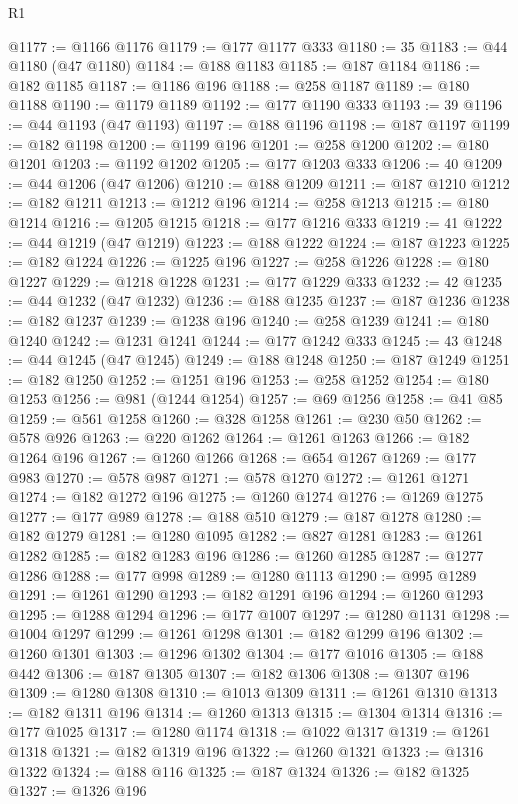 \begin{lexlean}{R1}
\begin{coremodule}
@1177 := @1166 @1176
@1179 := @177 @1177 @333
@1180 := 35
@1183 := @44 @1180 (@47 @1180)
@1184 := @188 @1183
@1185 := @187 @1184
@1186 := @182 @1185
@1187 := @1186 @196
@1188 := @258 @1187
@1189 := @180 @1188
@1190 := @1179 @1189
@1192 := @177 @1190 @333
@1193 := 39
@1196 := @44 @1193 (@47 @1193)
@1197 := @188 @1196
@1198 := @187 @1197
@1199 := @182 @1198
@1200 := @1199 @196
@1201 := @258 @1200
@1202 := @180 @1201
@1203 := @1192 @1202
@1205 := @177 @1203 @333
@1206 := 40
@1209 := @44 @1206 (@47 @1206)
@1210 := @188 @1209
@1211 := @187 @1210
@1212 := @182 @1211
@1213 := @1212 @196
@1214 := @258 @1213
@1215 := @180 @1214
@1216 := @1205 @1215
@1218 := @177 @1216 @333
@1219 := 41
@1222 := @44 @1219 (@47 @1219)
@1223 := @188 @1222
@1224 := @187 @1223
@1225 := @182 @1224
@1226 := @1225 @196
@1227 := @258 @1226
@1228 := @180 @1227
@1229 := @1218 @1228
@1231 := @177 @1229 @333
@1232 := 42
@1235 := @44 @1232 (@47 @1232)
@1236 := @188 @1235
@1237 := @187 @1236
@1238 := @182 @1237
@1239 := @1238 @196
@1240 := @258 @1239
@1241 := @180 @1240
@1242 := @1231 @1241
@1244 := @177 @1242 @333
@1245 := 43
@1248 := @44 @1245 (@47 @1245)
@1249 := @188 @1248
@1250 := @187 @1249
@1251 := @182 @1250
@1252 := @1251 @196
@1253 := @258 @1252
@1254 := @180 @1253
@1256 := @981 (@1244 @1254)
@1257 := @69 @1256
@1258 := @41 @85
@1259 := @561 @1258
@1260 := @328 @1258
@1261 := @230 @50
@1262 := @578 @926
@1263 := @220 @1262
@1264 := @1261 @1263
@1266 := @182 @1264 @196
@1267 := @1260 @1266
@1268 := @654 @1267
@1269 := @177 @983
@1270 := @578 @987
@1271 := @578 @1270
@1272 := @1261 @1271
@1274 := @182 @1272 @196
@1275 := @1260 @1274
@1276 := @1269 @1275
@1277 := @177 @989
@1278 := @188 @510
@1279 := @187 @1278
@1280 := @182 @1279
@1281 := @1280 @1095
@1282 := @827 @1281
@1283 := @1261 @1282
@1285 := @182 @1283 @196
@1286 := @1260 @1285
@1287 := @1277 @1286
@1288 := @177 @998
@1289 := @1280 @1113
@1290 := @995 @1289
@1291 := @1261 @1290
@1293 := @182 @1291 @196
@1294 := @1260 @1293
@1295 := @1288 @1294
@1296 := @177 @1007
@1297 := @1280 @1131
@1298 := @1004 @1297
@1299 := @1261 @1298
@1301 := @182 @1299 @196
@1302 := @1260 @1301
@1303 := @1296 @1302
@1304 := @177 @1016
@1305 := @188 @442
@1306 := @187 @1305
@1307 := @182 @1306
@1308 := @1307 @196
@1309 := @1280 @1308
@1310 := @1013 @1309
@1311 := @1261 @1310
@1313 := @182 @1311 @196
@1314 := @1260 @1313
@1315 := @1304 @1314
@1316 := @177 @1025
@1317 := @1280 @1174
@1318 := @1022 @1317
@1319 := @1261 @1318
@1321 := @182 @1319 @196
@1322 := @1260 @1321
@1323 := @1316 @1322
@1324 := @188 @116
@1325 := @187 @1324
@1326 := @182 @1325
@1327 := @1326 @196

\end{coremodule}
\end{lexlean}
